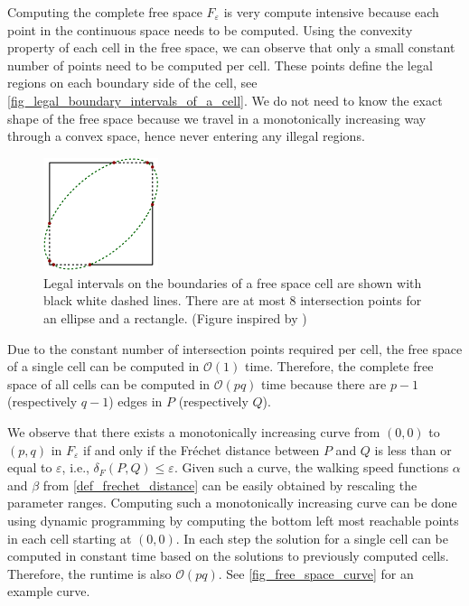 \documentclass[
oneside,
fontsize=11pt
]{scrartcl}
\begin{document}
Computing the complete free space $F_\varepsilon$ is very compute intensive 
because each point in the continuous space needs to be computed. 
Using the convexity property of each cell in the free space,
we can observe that only a small constant number of points need to be computed per cell. 
These points define the legal regions on each boundary side of the cell, see \autoref{fig_legal_boundary_intervals_of_a_cell}. 
We do not need to know the exact shape of the free space 
because we travel in a monotonically increasing way through a convex space,
hence never entering any illegal regions.

\begin{figure}[ht]
  \centering
  \includegraphics[width=0.3\textwidth]{images/frechet_distance/square-ellipse-intersection.pdf}
  \caption[Legal intervals on free space cell boundary]{
    Legal intervals on the boundaries of a free space cell are shown with black white dashed lines. 
    There are at most 8 intersection points for an ellipse and a rectangle. (Figure inspired by \cite{alt_computing_1995})}
  \label{fig_legal_boundary_intervals_of_a_cell}
\end{figure}

Due to the constant number of intersection points required per cell, 
the free space of a single cell can be computed in $\mathcal{O}(1)$ time.
Therefore, the complete free space of all cells can be computed in $\mathcal{O}(pq)$ time
because there are $p-1$ (respectively $q-1$) edges in $P$ (respectively $Q$).

We observe that there exists 
a monotonically increasing curve from $(0,0)$ to $(p,q)$ in $F_\varepsilon$
if and only if the Fréchet distance between $P$ and $Q$ is less than or equal to $\varepsilon$,
i.e., $\delta_F(P,Q) \leq \varepsilon$.
Given such a curve, the walking speed functions $\alpha$ and $\beta$ from \autoref{def_frechet_distance}
can be easily obtained by rescaling the parameter ranges. 
Computing such a monotonically increasing curve can be done using dynamic programming 
by computing the bottom left most reachable points in each cell starting at $(0,0)$. 
In each step the solution for a single cell can be computed in constant time based on the 
solutions to previously computed cells. 
Therefore, the runtime is also $\mathcal{O}(pq)$. 
See \autoref{fig_free_space_curve} for an example curve. \cite{alt_computing_1995}
\end{document}
